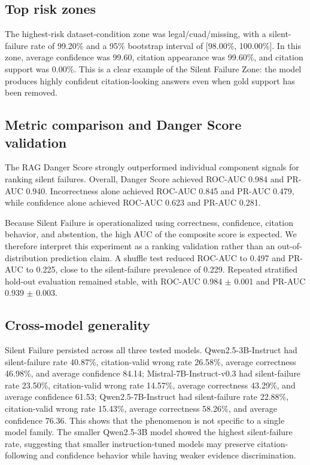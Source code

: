 \subsection{Top risk zones}

The highest-risk dataset-condition zone was legal/cuad/missing, with a silent-failure rate of 99.20\% and a 95\% bootstrap interval of [98.00\%, 100.00\%]. In this zone, average confidence was 99.60, citation appearance was 99.60\%, and citation support was 0.00\%. This is a clear example of the Silent Failure Zone: the model produces highly confident citation-looking answers even when gold support has been removed.



\subsection{Metric comparison and Danger Score validation}

The RAG Danger Score strongly outperformed individual component signals for ranking silent failures. Overall, Danger Score achieved ROC-AUC 0.984 and PR-AUC 0.940. Incorrectness alone achieved ROC-AUC 0.845 and PR-AUC 0.479, while confidence alone achieved ROC-AUC 0.623 and PR-AUC 0.281.

Because Silent Failure is operationalized using correctness, confidence, citation behavior, and abstention, the high AUC of the composite score is expected. We therefore interpret this experiment as a ranking validation rather than an out-of-distribution prediction claim. A shuffle test reduced ROC-AUC to 0.497 and PR-AUC to 0.225, close to the silent-failure prevalence of 0.229. Repeated stratified hold-out evaluation remained stable, with ROC-AUC 0.984 $\pm$ 0.001 and PR-AUC 0.939 $\pm$ 0.003.



\subsection{Cross-model generality}

Silent Failure persisted across all three tested models. Qwen2.5-3B-Instruct had silent-failure rate 40.87\%, citation-valid wrong rate 26.58\%, average correctness 46.98\%, and average confidence 84.14; Mistral-7B-Instruct-v0.3 had silent-failure rate 23.50\%, citation-valid wrong rate 14.57\%, average correctness 43.29\%, and average confidence 61.53; Qwen2.5-7B-Instruct had silent-failure rate 22.88\%, citation-valid wrong rate 15.43\%, average correctness 58.26\%, and average confidence 76.36. This shows that the phenomenon is not specific to a single model family. The smaller Qwen2.5-3B model showed the highest silent-failure rate, suggesting that smaller instruction-tuned models may preserve citation-following and confidence behavior while having weaker evidence discrimination.



